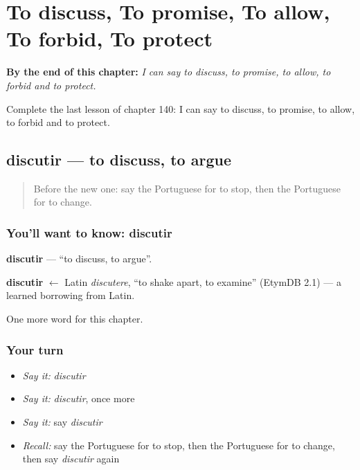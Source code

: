 
\chapter{To discuss, To promise, To allow, To forbid, To protect}
\label{ch:pt-to-discuss-to-promise-to-allow-to-forbid-to-protect}

\begin{chapteropening}
\textbf{By the end of this chapter:} \emph{I can say to discuss, to promise, to allow, to forbid and to protect.}

Complete the last lesson of chapter 140: I can say to discuss, to promise, to allow, to forbid and to protect.
\end{chapteropening}

\section[discutir]{discutir — to discuss, to argue}

\label{lesson:PT-C140-discutir}



\begin{quote}
Before the new one: say the Portuguese for to stop, then the Portuguese for to change.
\end{quote}

\subsection*{You'll want to know: discutir}
\textbf{discutir} — \textquotedblleft{}to discuss, to argue\textquotedblright{}.

\begin{cousinweb}
\textbf{discutir} $\leftarrow$ Latin \emph{discutere}, \textquotedblleft{}to shake apart, to examine\textquotedblright{} (EtymDB 2.1) — a learned borrowing from Latin.
\end{cousinweb}

\begin{grammarlens}[title={What you've built}]
One more word for this chapter.
\end{grammarlens}

\subsection*{Your turn}
\begin{itemize}
\raggedright
  \item \emph{Say it:} \emph{discutir}
  \item \emph{Say it:} \emph{discutir}, once more
  \item \emph{Say it:} say \emph{discutir}
  \item \emph{Recall:} say the Portuguese for to stop, then the Portuguese for to change, then say \emph{discutir} again
\end{itemize}

